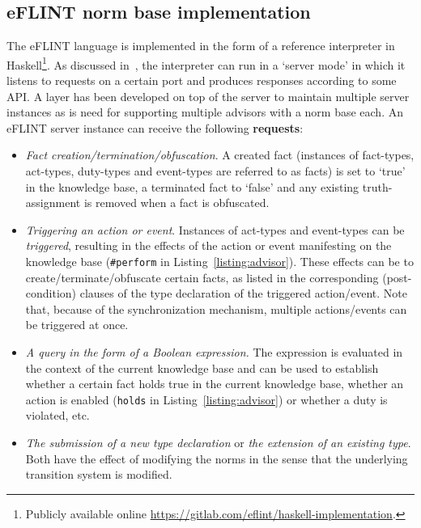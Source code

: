 \subsection{eFLINT norm base implementation}
%
The eFLINT language is implemented in the form of a reference interpreter in Haskell\footnote{Publicly available online \url{https://gitlab.com/eflint/haskell-implementation}.}.
%
As discussed in~\cite{VanBinsbergen2020EFLINT:Specifications}, the interpreter can run in a `server mode' in which it listens to requests on a certain port and produces responses according to some API.
%
A layer has been developed on top of the server to maintain multiple server instances as is need for supporting multiple advisors with a norm base each.
%
An eFLINT server instance can receive the following \textbf{requests}:
%
\begin{itemize}
\item \textit{Fact creation/termination/obfuscation}. A created fact (instances of fact-types, act-types, duty-types and event-types are referred to as facts) is set to `true' in the knowledge base, a terminated fact to `false' and any existing truth-assignment is removed when a fact is obfuscated.
\item \textit{Triggering an action or event}. Instances of act-types and event-types can be \emph{triggered}, resulting in the effects of the action or event manifesting on the knowledge base (\texttt{#perform} in Listing~\ref{listing:advisor}). These effects can be to create/terminate/obfuscate certain facts, as listed in the corresponding (post-condition) clauses of the type declaration of the triggered action/event. Note that, because of the synchronization mechanism, multiple actions/events can be triggered at once.
\item \textit{A query in the form of a Boolean expression.} The expression is evaluated in the context of the current knowledge base and can be used to establish whether a certain fact holds true in the current knowledge base, whether an action is enabled (\texttt{holds} in Listing~\ref{listing:advisor}) or whether a duty is violated, etc.
\item\textit{The submission of a new type declaration} or \textit{the extension of an existing type}. Both have the effect of modifying the norms in the sense that the underlying transition system is modified. %
\end{itemize}
